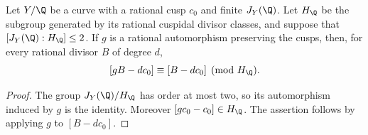 

\begin{lemma}\label{lem:decic232-index-two}
Let $Y/\Q$ be a curve with a rational cusp $c_0$ and finite
$J_Y(\Q)$. Let $H_\Q$ be the subgroup generated by its rational
cuspidal divisor classes, and suppose that $[J_Y(\Q):H_\Q]\leq2$.
If $g$ is a rational automorphism preserving the cusps, then, for
every rational divisor $B$ of degree $d$,
\[
 [gB-dc_0]\equiv[B-dc_0]\pmod{H_\Q}.
\]
\end{lemma}
\begin{proof}
The group $J_Y(\Q)/H_\Q$ has order at most two, so its automorphism
induced by $g$ is the identity. Moreover $[gc_0-c_0]\in H_\Q$.
The assertion follows by applying $g$ to $[B-dc_0]$.
\end{proof}

